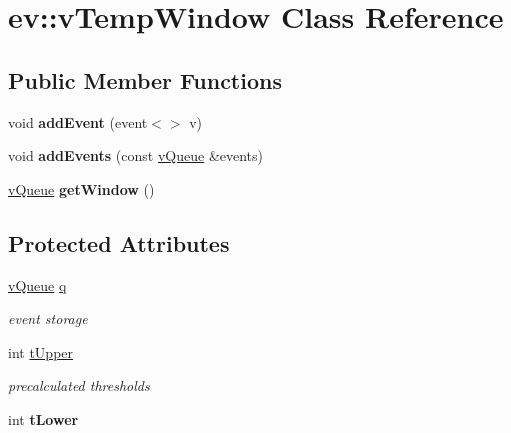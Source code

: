 \hypertarget{classev_1_1vTempWindow}{}\section{ev\+:\+:v\+Temp\+Window Class Reference}
\label{classev_1_1vTempWindow}
\subsection*{Public Member Functions}
\begin{DoxyCompactItemize}
\item 
void {\bfseries add\+Event} (event$<$$>$ v)\hypertarget{classev_1_1vTempWindow_a9499371e18cc811e2cd3e47e8e96f8ca}{}\label{classev_1_1vTempWindow_a9499371e18cc811e2cd3e47e8e96f8ca}

\item 
void {\bfseries add\+Events} (const \hyperlink{classev_1_1vQueue}{v\+Queue} \&events)\hypertarget{classev_1_1vTempWindow_a925ee62f3dff9517654fd6a9a402616b}{}\label{classev_1_1vTempWindow_a925ee62f3dff9517654fd6a9a402616b}

\item 
\hyperlink{classev_1_1vQueue}{v\+Queue} {\bfseries get\+Window} ()\hypertarget{classev_1_1vTempWindow_a40ddfc12e259c028a57d5dd188b3e2e9}{}\label{classev_1_1vTempWindow_a40ddfc12e259c028a57d5dd188b3e2e9}

\end{DoxyCompactItemize}
\subsection*{Protected Attributes}
\begin{DoxyCompactItemize}
\item 
\hyperlink{classev_1_1vQueue}{v\+Queue} \hyperlink{classev_1_1vTempWindow_abed022ad51f68443a2350fbeabbb4233}{q}\hypertarget{classev_1_1vTempWindow_abed022ad51f68443a2350fbeabbb4233}{}\label{classev_1_1vTempWindow_abed022ad51f68443a2350fbeabbb4233}

\begin{DoxyCompactList}\small\item\em event storage \end{DoxyCompactList}\item 
int \hyperlink{classev_1_1vTempWindow_a909a8f6df0014d1f318c6209223f5fad}{t\+Upper}\hypertarget{classev_1_1vTempWindow_a909a8f6df0014d1f318c6209223f5fad}{}\label{classev_1_1vTempWindow_a909a8f6df0014d1f318c6209223f5fad}

\begin{DoxyCompactList}\small\item\em precalculated thresholds \end{DoxyCompactList}\item 
int {\bfseries t\+Lower}\hypertarget{classev_1_1vTempWindow_a47845a9e47b73598e2a325c06e994bed}{}\label{classev_1_1vTempWindow_a47845a9e47b73598e2a325c06e994bed}

\end{DoxyCompactItemize}


